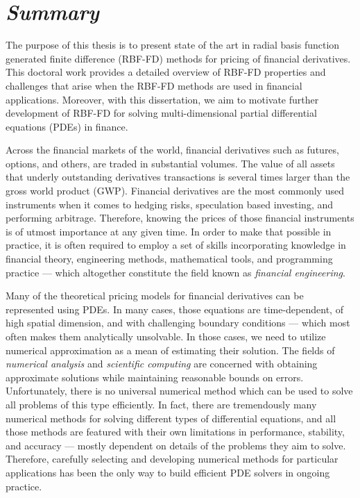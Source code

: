 \documentclass{UUThesisTemplate}
\begin{document}
\newpage
\chapter*{{{\sffamily\emph{Summary}}}}
{\noteunic

\par
The purpose of this thesis is to present state of the art in radial basis function generated finite difference (RBF-FD) methods for pricing of financial derivatives. This doctoral work provides a detailed overview of RBF-FD properties and challenges that arise when the RBF-FD methods are used in financial applications. Moreover, with this dissertation, we aim to motivate further development of RBF-FD for solving multi-dimensional partial differential equations (PDEs) in finance.

\par
Across the financial markets of the world, financial derivatives such as futures, options, and others, are traded in substantial volumes. The value of all assets that underly outstanding derivatives transactions is several times larger than the gross world product (GWP). Financial derivatives are the most commonly used instruments when it comes to hedging risks, speculation based investing, and performing arbitrage. Therefore, knowing the prices of those financial instruments is of utmost importance at any given time. In order to make that possible in practice, it is often required to employ a set of skills incorporating knowledge in financial theory, engineering methods, mathematical tools, and programming practice --- which altogether constitute the field known as \emph{financial engineering}. 

\par
Many of the theoretical pricing models for financial derivatives can be represented using PDEs. In many cases, those equations are time-dependent, of high spatial dimension, and with challenging boundary conditions --- which most often makes them analytically unsolvable. In those cases, we need to utilize numerical approximation as a mean of estimating their solution. The fields of \emph{numerical analysis} and \emph{scientific computing} are concerned with obtaining approximate solutions while maintaining reasonable bounds on errors. Unfortunately, there is no universal numerical method which can be used to solve all problems of this type efficiently. In fact, there are tremendously many numerical methods for solving different types of differential equations, and all those methods are featured with their own limitations in performance, stability, and accuracy --- mostly dependent on details of the problems they aim to solve. Therefore, carefully selecting and developing numerical methods for particular applications has been the only way to build efficient PDE solvers in ongoing practice. 

}
\end{document}
